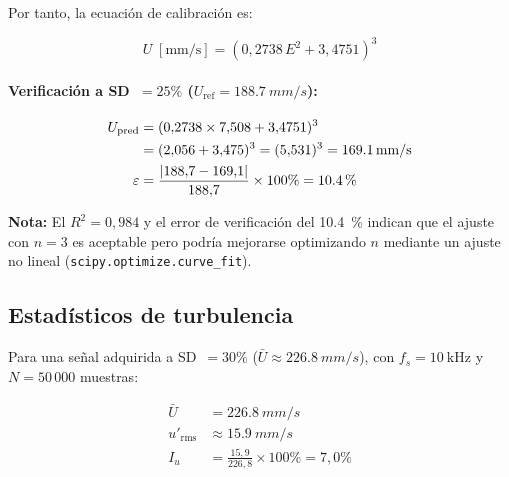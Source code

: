 \documentclass[12pt,a4paper]{article}
\begin{document}
Por tanto, la ecuación de calibración es:

\begin{equation}
	\boxed{U\;[\text{mm/s}]
	= (0{,}2738\,E^2 + 3{,}4751)^{3}}
	\label{eq:calibracion_final}
\end{equation}

\paragraph{Verificación a SD~$= 25\%$ ($U_\mathrm{ref} = \SI{188.7}{mm/s}$):}
\begin{align}
	U_\mathrm{pred} & = (0{,}2738 \times 7{,}508 + 3{,}4751)^3 \notag   \\
	                & = (2{,}056 + 3{,}475)^3
	= (5{,}531)^3
	= \SI{169.1}{mm/s}                                                  \\
	\varepsilon     & = \frac{|188{,}7 - 169{,}1|}{188{,}7}\times 100\%
	= \SI{10.4}{\percent}
	\label{eq:verificacion}
\end{align}

\textbf{Nota:} El $R^2 = 0{,}984$ y el error de verificación del
\SI{10.4}{\percent} indican que el ajuste con $n=3$ es aceptable pero
podría mejorarse optimizando $n$ mediante un ajuste no lineal
(\texttt{scipy.optimize.curve\_fit}).

\subsection{Estadísticos de turbulencia}

Para una señal adquirida a SD~$= 30\%$ ($\bar{U}\approx\SI{226.8}{mm/s}$),
con $f_s = \SI{10}{\kHz}$ y $N = 50\,000$ muestras:

\begin{align}
	\bar{U}         & = \SI{226.8}{mm/s} \label{eq:Umean_ej}         \\
	u'_\mathrm{rms} & \approx \SI{15.9}{mm/s} \label{eq:urms_ej}     \\
	I_u             & = \frac{15{,}9}{226{,}8}\times 100\% = 7{,}0\%
	\label{eq:Iu_ej}
\end{align}
\end{document}
